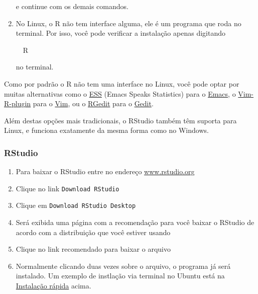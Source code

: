 \documentclass[a4paper,12pt]{article}\usepackage[]{graphicx}\usepackage[]{color}
\makeatletter
\newcommand{\hlstd}[1]{\textcolor[rgb]{0.345,0.345,0.345}{#1}}%
\newenvironment{kframe}{%
 \def\at@end@of@kframe{}%
 \ifinner\ifhmode%
  \def\at@end@of@kframe{\end{minipage}}%
  \begin{minipage}{\columnwidth}%
 \fi\fi%
 \def\FrameCommand##1{\hskip\@totalleftmargin \hskip-\fboxsep
 \colorbox{shadecolor}{##1}\hskip-\fboxsep
     \hskip-\linewidth \hskip-\@totalleftmargin \hskip\columnwidth}%
 \MakeFramed {\advance\hsize-\width
   \@totalleftmargin\z@ \linewidth\hsize
   \@setminipage}}%
 {\par\unskip\endMakeFramed%
 \at@end@of@kframe}
\newenvironment{knitrout}{}{} %
\providecommand{\R}{\textsf{R}\xspace}
\providecommand{\RStudio}{\textsf{RStudio}\xspace}
\makeatother
\begin{document}
\begin{enumerate}
  e continue com os demais comandos.
\item No Linux, o \R não tem interface alguma, ele é um programa que
  roda no terminal. Por isso, você pode verificar a instalação apenas digitando
\begin{knitrout}\small
{}\color{fgcolor}\begin{kframe}
\noindent
\ttfamily
\hlstd{}\hlstd{\ \ }\hlstd{R}\hspace*{\fill}
\mbox{}
\normalfont
\normalsize
\end{kframe}
\end{knitrout}

  no terminal.
\end{enumerate}

Como por padrão o \R não tem uma interface no Linux, você pode optar por
muitas alternativas como o \href{http://ess.r-project.org}{ESS} (Emacs
Speaks Statistics) para o
\href{http://www.gnu.org/software/emacs/}{Emacs}, o
\href{http://www.lepem.ufc.br/jaa/r-plugin.html}{Vim-R-plugin} para o
\href{http://www.vim.org}{Vim}, ou o
\href{http://rgedit.sourceforge.net}{RGedit} para o
\href{http://projects.gnome.org/gedit}{Gedit}.

Além destas opções mais tradicionais, o \RStudio também têm suporta para
Linux, e funciona exatamente da mesma forma como no Windows.

\subsubsection{\RStudio}

\begin{enumerate}
\item Para baixar o \RStudio entre no endereço
  \url{www.rstudio.org}
\item Clique no link \texttt{Download RStudio}
\item Clique em \texttt{Download RStudio Desktop}
\item Será exibida uma página com a recomendação para você baixar o
  \RStudio de acordo com a distribuição que você estiver usando
\item Clique no link recomendado para baixar o arquivo
\item Normalmente clicando duas vezes sobre o arquivo, o programa já
  será instalado. Um exemplo de instlação via terminal no Ubuntu está na
  \hyperref[sec:irl]{Instalação rápida} acima.
\end{enumerate}
\end{document}
